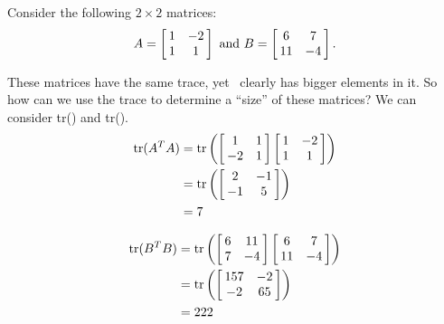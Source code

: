 Consider the following $2 \times 2$ matrices:
$$\tta = \bmx{cc} 1&-2\\1&1\emx \ \text{and}\ \ttb = \bmx{cc} 6&7\\11&-4\emx.$$

These matrices have the same trace, yet \ttb\ clearly has bigger elements in it. So how can we use the trace to determine a ``size'' of these matrices? We can consider tr(\ttat\tta) and tr(\ttbt\ttb).
\begin{align*}
\text{tr}(\ttat\tta) &= \text{tr}\left(\bmx{cc}1&1\\-2&1\emx\bmx{cc}1&-2\\1&1\emx\right)\\
			&=	\text{tr}\left( \bmx{cc}2&-1\\-1&5\emx\right)\\
			&= 7
\end{align*}

\begin{align*}
\text{tr}(\ttbt\ttb) &= \text{tr}\left(\bmx{cc} 6&11\\7&-4\emx\bmx{cc}6&7\\11&-4\emx\right)\\
							&= \text{tr}\left(\bmx{cc} 157 & -2\\-2 & 65\emx \right)\\
							&= 222
\end{align*}

